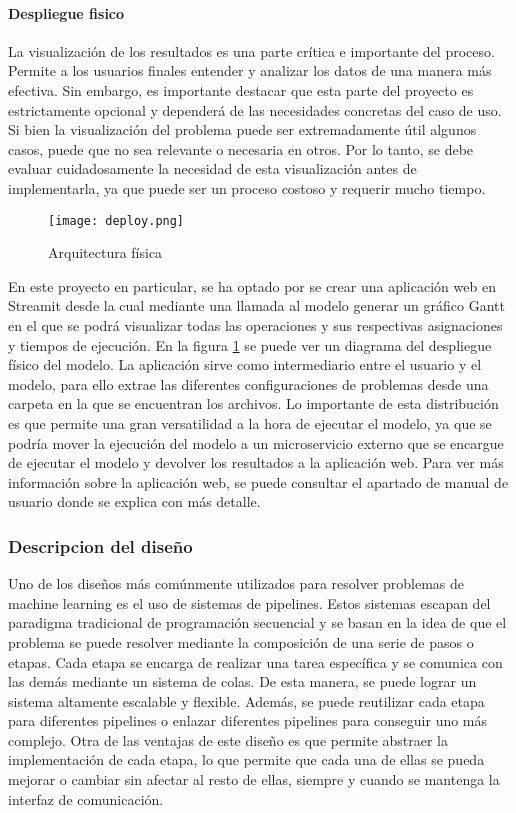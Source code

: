 \paragraph{Despliegue fisico}
La visualización de los resultados es una parte crítica e importante del proceso. Permite 
a los usuarios finales entender y analizar los datos de una manera más efectiva.  
Sin embargo, es importante destacar que esta parte del proyecto es 
estrictamente opcional y dependerá de las necesidades concretas del caso de uso. 
Si bien la visualización del problema puede ser extremadamente útil algunos casos, puede que no sea 
relevante o necesaria en otros. Por lo tanto, se debe evaluar cuidadosamente la necesidad de 
esta visualización antes de implementarla, ya que puede ser un proceso costoso y 
requerir mucho tiempo.\medskip

\begin{figure}[ht]
    \centering
    \texttt{[image: deploy.png]}
    \caption{Arquitectura física}
    \label{fig:despliegue}
\end{figure}

En este proyecto en particular, se ha optado por se crear una aplicación web en Streamit\cite{Streamlit} 
desde la cual mediante una llamada al modelo generar un gráfico Gantt en el que se podrá
visualizar todas las operaciones y sus respectivas asignaciones y tiempos de ejecución.
En la figura \ref{fig:despliegue} se puede ver un diagrama del despliegue físico del modelo.
La aplicación sirve como intermediario entre el usuario y el modelo, para ello extrae las
diferentes configuraciones de problemas desde una carpeta en la que se encuentran los 
archivos. Lo importante de esta distribución es que permite una gran versatilidad a la hora
de ejecutar el modelo, ya que se podría mover la ejecución del modelo a un microservicio
externo que se encargue de ejecutar el modelo y devolver los resultados a la aplicación web.
Para ver más información sobre la aplicación web, se puede consultar el apartado de manual
de usuario donde se explica con más detalle. 

\subsubsection{Descripcion del diseño}
Uno de los diseños más comúnmente utilizados para resolver problemas de machine learning
es el uso de sistemas de pipelines. Estos sistemas escapan del paradigma tradicional de
programación secuencial y se basan en la idea de que el problema se puede resolver
mediante la composición de una serie de pasos o etapas. Cada etapa se encarga de realizar
una tarea específica y se comunica con las demás mediante un sistema de colas. De esta
manera, se puede lograr un sistema altamente escalable y flexible. Además, se puede
reutilizar cada etapa para diferentes pipelines o enlazar diferentes pipelines para
conseguir uno más complejo. Otra de las ventajas de este diseño es que permite
abstraer la implementación de cada etapa, lo que permite que cada una de ellas se pueda
mejorar o cambiar sin afectar al resto de ellas, siempre y cuando se mantenga la
interfaz de comunicación.

